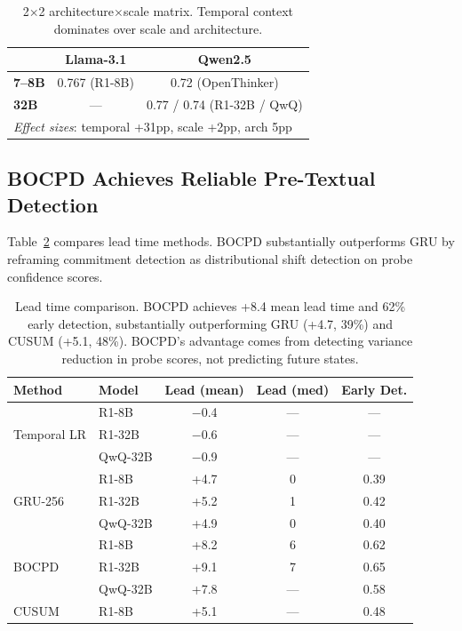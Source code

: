 \documentclass[11pt,a4paper]{article}
\begin{document}
\begin{table}[t]
\centering
\small
\begin{tabular}{l|cc}
\toprule
 & \textbf{Llama-3.1} & \textbf{Qwen2.5} \\
\midrule
\textbf{7--8B} & 0.767 (R1-8B) & 0.72 (OpenThinker) \\
\textbf{32B} & --- & 0.77 / 0.74 (R1-32B / QwQ) \\
\midrule
\multicolumn{3}{l}{\textit{Effect sizes}: temporal +31pp, scale +2pp, arch 5pp} \\
\bottomrule
\end{tabular}
\caption{2$\times$2 architecture$\times$scale matrix. Temporal context dominates over scale and architecture.}
\label{tab:2x2}
\end{table}

\subsection{BOCPD Achieves Reliable Pre-Textual Detection}
\label{sec:exp-bocpd}

Table~\ref{tab:bocpd} compares lead time methods. BOCPD substantially outperforms GRU by reframing commitment detection as distributional shift detection on probe confidence scores.

\begin{table}[t]
\centering
\small
\begin{tabular}{llccc}
\toprule
\textbf{Method} & \textbf{Model} & \textbf{Lead (mean)} & \textbf{Lead (med)} & \textbf{Early Det.} \\
\midrule
\multirow{3}{*}{Temporal LR} & R1-8B & $-$0.4 & --- & --- \\
 & R1-32B & $-$0.6 & --- & --- \\
 & QwQ-32B & $-$0.9 & --- & --- \\
\midrule
\multirow{3}{*}{GRU-256} & R1-8B & +4.7 & 0 & 0.39 \\
 & R1-32B & +5.2 & 1 & 0.42 \\
 & QwQ-32B & +4.9 & 0 & 0.40 \\
\midrule
\multirow{3}{*}{BOCPD} & R1-8B & +8.2 & 6 & 0.62 \\
 & R1-32B & +9.1 & 7 & 0.65 \\
 & QwQ-32B & +7.8 & --- & 0.58 \\
\midrule
CUSUM & R1-8B & +5.1 & --- & 0.48 \\
\bottomrule
\end{tabular}
\caption{Lead time comparison. BOCPD achieves +8.4 mean lead time and 62\% early detection, substantially outperforming GRU (+4.7, 39\%) and CUSUM (+5.1, 48\%). BOCPD's advantage comes from detecting variance reduction in probe scores, not predicting future states.}
\label{tab:bocpd}
\end{table}
\end{document}
